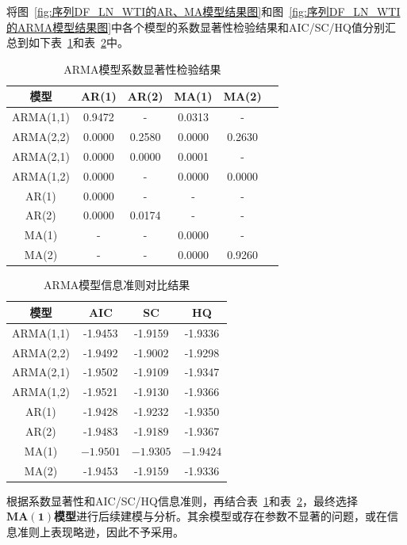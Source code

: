 \documentclass[12pt,a4paper]{ctexart}
\begin{document}
将图~\ref{fig:序列DF_LN_WTI的AR、MA模型结果图}和图~\ref{fig:序列DF_LN_WTI的ARMA模型结果图}中各个模型的系数显著性检验结果和AIC/SC/HQ值分别汇总到如下表~\ref{tab:arma_pvalue_new}和表~\ref{tab:arma_criteria_new}中。
\begin{table}[H]
\centering
\caption{ARMA模型系数显著性检验结果}
\label{tab:arma_pvalue_new}
\begin{tabular}{cccccc}
\toprule[1.2pt]
模型  & AR(1) & AR(2) & MA(1) & MA(2) \\
\midrule[0.75pt]
ARMA(1,1)  & 0.9472 & - & 0.0313 & - \\
ARMA(2,2)  & 0.0000 & 0.2580 & 0.0000 & 0.2630 \\
ARMA(2,1)  & 0.0000 & 0.0000 & 0.0001 & - \\
ARMA(1,2)  & 0.0000 & - & 0.0000 & 0.0000 \\
AR(1)      & 0.0000 & - & - & - \\
AR(2)      & 0.0000 & 0.0174 & - & - \\
MA(1)      & - & - & 0.0000 & - \\
MA(2)      & - & - & 0.0000 & 0.9260 \\
\bottomrule[1.2pt]
\end{tabular}
\end{table}

\begin{table}[H]
\centering
\caption{ARMA模型信息准则对比结果}
\label{tab:arma_criteria_new}
\begin{tabular}{cccc}
\toprule[1.2pt]
模型 & AIC & SC & HQ \\
\midrule[0.75pt]
ARMA(1,1) & -1.9453 & -1.9159 & -1.9336 \\
ARMA(2,2) & -1.9492 & -1.9002 & -1.9298 \\
ARMA(2,1) & -1.9502 & -1.9109 & -1.9347 \\
ARMA(1,2) & -1.9521 & -1.9130 & -1.9366 \\
AR(1)     & -1.9428 & -1.9232 & -1.9350 \\
AR(2)     & -1.9483 & -1.9189 & -1.9367 \\
MA(1)     & $\mathbf{-1.9501}$ & $\mathbf{-1.9305}$ & $\mathbf{-1.9424}$ \\
MA(2)     & -1.9453 & -1.9159 & -1.9336 \\
\bottomrule[1.2pt]
\end{tabular}
\end{table}
根据系数显著性和AIC/SC/HQ信息准则，再结合表~\ref{tab:arma_pvalue_new}和表~\ref{tab:arma_criteria_new}，最终选择 $\mathbf{MA}(\mathbf{1})$\textbf{模型}进行后续建模与分析。其余模型或存在参数不显著的问题，或在信息准则上表现略逊，因此不予采用。
\end{document}
